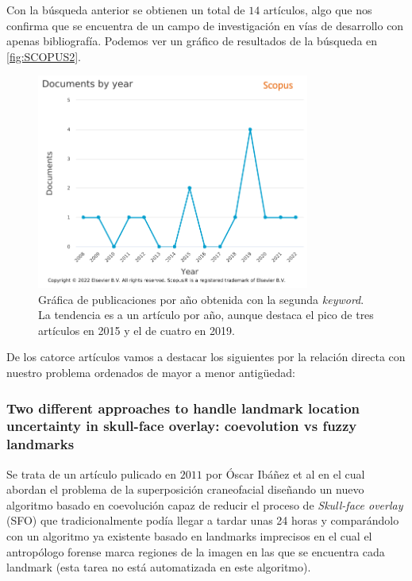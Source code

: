             \medskip

            \noindent Con la búsqueda anterior se obtienen un total de $14$ artículos, algo que nos confirma que se encuentra de un campo de investigación en vías de desarrollo con apenas bibliografía. Podemos ver un gráfico de resultados de la búsqueda en \autoref{fig:SCOPUS2}.

            \begin{figure}[!h]
                \centering
                \includegraphics[width=0.8\textwidth]{img/Scopus_2.png}
                \caption{Gráfica de publicaciones por año obtenida con la segunda \textit{keyword}. La tendencia es a un artículo por año, aunque destaca el pico de tres artículos en 2015 y el de cuatro en 2019.}
                \label{fig:SCOPUS2}
            \end{figure}

            \medskip

            \noindent De los catorce artículos vamos a destacar los siguientes por la relación directa con nuestro problema ordenados de mayor a menor antigüedad: 

            \subsubsection{Two diﬀerent approaches to handle landmark location uncertainty in skull-face overlay: coevolution vs fuzzy landmarks}
                \noindent Se trata de un artículo pulicado en $2011$ por Óscar Ibáñez et al \cite{ibanez2011two} en el cual abordan el problema de la superposición craneofacial diseñando un nuevo algoritmo basado en coevolución capaz de reducir el proceso de \textit{Skull-face overlay} (SFO) que tradicionalmente podía llegar a tardar unas 24 horas y comparándolo con un algoritmo ya existente basado en landmarks imprecisos en el cual el antropólogo forense marca regiones de la imagen en las que se encuentra cada landmark (esta tarea no está automatizada en este algoritmo).

